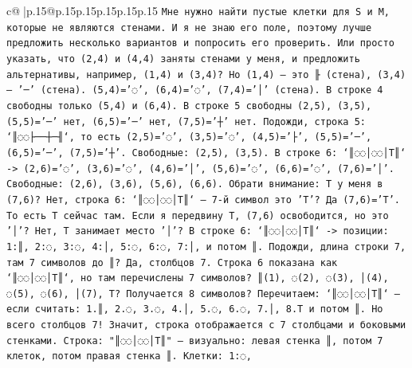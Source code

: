 \documentclass{article}
\begin{document}
{\begin{supertabular}{c@{$\;$}|p{.15\linewidth}@{}p{.15\linewidth}p{.15\linewidth}p{.15\linewidth}p{.15\linewidth}p{.15\linewidth}}
{{{\texttt{Мне нужно найти пустые клетки для S и M, которые не являются стенами. И я не знаю его поле, поэтому лучше предложить несколько вариантов и попросить его проверить. Или просто указать, что (2,4) и (4,4) заняты стенами у меня, и предложить альтернативы, например, (1,4) и (3,4)? Но (1,4) — это ╟ (стена), (3,4) — '─' (стена). (5,4)='◌', (6,4)='◌', (7,4)='│' (стена). В строке 4 свободны только (5,4) и (6,4). В строке 5 свободны (2,5), (3,5), (5,5)='─' нет, (6,5)='─' нет, (7,5)='┼' нет. Подожди, строка 5: `║◌◌├──┼─╢`, то есть (2,5)='◌', (3,5)='◌', (4,5)='├', (5,5)='─', (6,5)='─', (7,5)='┼'. Свободные: (2,5), (3,5). В строке 6: `║◌◌│◌◌│T║` {-}> (2,6)='◌', (3,6)='◌', (4,6)='│', (5,6)='◌', (6,6)='◌', (7,6)='│'. Свободные: (2,6), (3,6), (5,6), (6,6). Обрати внимание: T у меня в (7,6)? Нет, строка 6: `║◌◌│◌◌│T║` — 7{-}й символ это 'T'? Да (7,6)='T'. То есть T сейчас там. Если я передвину T, (7,6) освободится, но это '│'? Нет, T занимает место '│'? В строке 6: `║◌◌│◌◌│T║` {-}> позиции: 1:║, 2:◌, 3:◌, 4:│, 5:◌, 6:◌, 7:│, и потом ║. Подожди, длина строки 7, там 7 символов до ║? Да, столбцов 7. Строка 6 показана как `║◌◌│◌◌│T║`, но там перечислены 7 символов? ║(1), ◌(2), ◌(3), │(4), ◌(5), ◌(6), │(7), T? Получается 8 символов? Перечитаем: `║◌◌│◌◌│T║` — если считать: 1.║, 2.◌, 3.◌, 4.│, 5.◌, 6.◌, 7.│, 8.T и потом ║. Но всего столбцов 7! Значит, строка отображается с 7 столбцами и боковыми стенками. Строка: "║◌◌│◌◌│T║" — визуально: левая стенка ║, потом 7 клеток, потом правая стенка ║. Клетки: 1:◌,} \\
            }
        }
    }
     \\ \\


\end{supertabular}}
\end{document}
